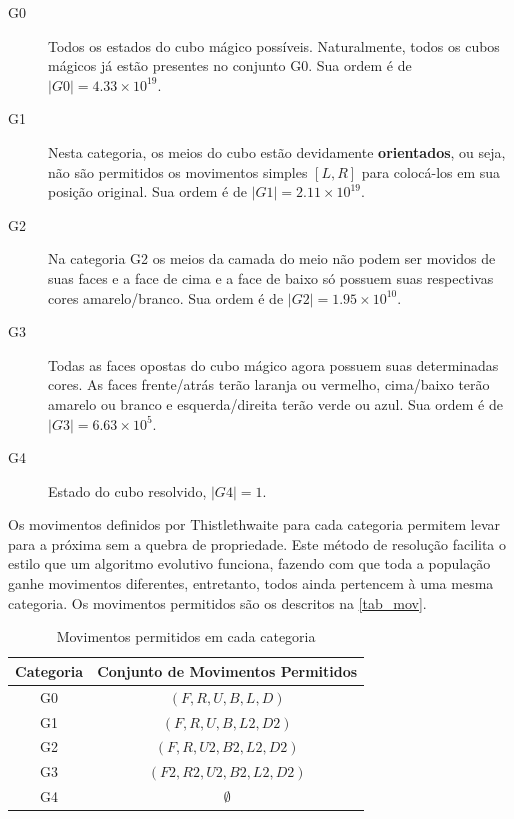 \documentclass[12pt]{article}
\begin{document}
    \begin{description}
      \item [G0] Todos os estados do cubo mágico possíveis. Naturalmente, todos os cubos mágicos já estão presentes no conjunto G0. Sua ordem é de $|G0| = 4.33 \times 10^{19}$.
      \item [G1] Nesta categoria, os meios do cubo estão devidamente \textbf{orientados}, ou seja, não são permitidos os movimentos simples $[L, R]$ para colocá-los em sua posição original. Sua ordem é de $|G1| = 2.11 \times 10^{19}$.
      \item [G2] Na categoria G2 os meios da camada do meio não podem ser movidos de suas faces e a face de cima e a face de baixo só possuem suas respectivas cores amarelo/branco. Sua ordem é de $|G2| = 1.95 \times 10^{10}$.
      \item [G3] Todas as faces opostas do cubo mágico agora possuem suas determinadas cores. As faces frente/atrás terão laranja ou vermelho, cima/baixo terão amarelo ou branco e esquerda/direita terão verde ou azul. Sua ordem é de $|G3| = 6.63 \times 10^{5}$.
      \item [G4] Estado do cubo resolvido, $|G4| = 1$.
    \end{description}

  Os movimentos definidos por Thistlethwaite para cada categoria permitem levar para a próxima sem a quebra de propriedade. Este método de resolução facilita o estilo que um algoritmo evolutivo funciona, fazendo com que toda a população ganhe movimentos diferentes, entretanto, todos ainda pertencem à uma mesma categoria. Os movimentos permitidos são os descritos na \autoref{tab_mov}.

  \begin{table}[ht]
      \centering
      \caption{Movimentos permitidos em cada categoria} \label{tab_mov}
      \begin{tabular}{|c|c|}
        \hline
        \textbf{Categoria} & \textbf{Conjunto de Movimentos Permitidos}  \\ \hline
            G0             &  $(F, R, U, B, L, D)$           \\ \hline
            G1             &  $(F, R, U, B, L2, D2)$         \\ \hline
            G2             &  $(F, R, U2, B2, L2, D2)$       \\ \hline
            G3             &  $(F2, R2, U2, B2, L2, D2)$     \\ \hline
            G4             &  $\emptyset$                    \\ \hline
      \end{tabular}
  \end{table}
\end{document}
